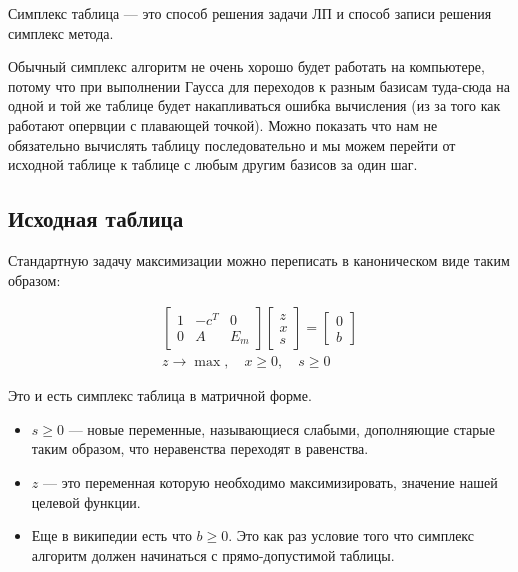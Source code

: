 \documentclass[a4paper,article,14pt]{extarticle}
\begin{document}
Симплекс таблица --- это способ решения задачи ЛП и способ записи решения симплекс метода.

Обычный симплекс алгоритм не очень хорошо будет работать на компьютере, потому что  при выполнении Гаусса для переходов к разным базисам туда-сюда на одной и той же таблице будет накапливаться ошибка вычисления (из за того как работают опервции с плавающей точкой).
Можно показать что нам не обязательно вычислять таблицу последовательно и мы можем перейти от исходной таблице к таблице с любым другим базисов за один шаг.

\subsection{Исходная таблица}

Стандартную задачу максимизации можно переписать в каноническом виде таким образом:

\begin{equation} \label{eq:matrix_form_1_phaze}
    \begin{gathered}
        \begin{bmatrix}
            1 & -c^T & 0 \\
            0 & A & E_m
        \end{bmatrix}
        \begin{bmatrix}
            z \\ x \\ s
        \end{bmatrix}
        =
        \begin{bmatrix}
            0 \\ b
        \end{bmatrix}
        \\
        z \rightarrow \max, \quad x \ge 0, \quad s \ge 0
    \end{gathered}
\end{equation}

Это и есть симплекс таблица в матричной форме.

\begin{itemize}
    \item \(s \ge 0\) --- новые переменные, называющиеся слабыми, дополняющие старые таким образом, что неравенства переходят в равенства.
    \item \(z\) --- это переменная которую необходимо максимизировать, значение нашей целевой функции.
    \item
        Еще в википедии есть что \(b \ge 0\).
        Это как раз условие того что симплекс алгоритм должен начинаться с прямо-допустимой таблицы.
\end{itemize}
\end{document}
